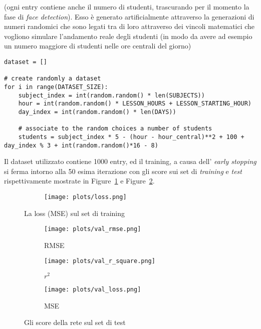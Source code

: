 \noindent
(ogni entry contiene anche il numero di studenti, trascurando per il momento la 
fase di \textit{face detection}). Esso è generato artificialmente attraverso la generazioni 
di numeri randomici che sono legati tra di loro attraverso dei vincoli matematici che vogliono 
simulare l'andamento reale degli studenti (in modo da avere ad esempio un numero maggiore di 
studenti nelle ore centrali del giorno)

\begin{verbatim}
dataset = []

# create randomly a dataset
for i in range(DATASET_SIZE):
    subject_index = int(random.random() * len(SUBJECTS))
    hour = int(random.random() * LESSON_HOURS + LESSON_STARTING_HOUR)
    day_index = int(random.random() * len(DAYS))

    # associate to the random choices a number of students
    students = subject_index * 5 - (hour - hour_central)**2 + 100 + day_index % 3 + int(random.random()*16 - 8)
\end{verbatim}

Il dataset utilizzato contiene 1000 entry, ed il training, a causa dell'
\textit{early stopping} si ferma intorno alla 50 esima iterazione con gli 
score sui set di \textit{training} e \textit{test} rispettivamente mostrate in 
Figure~\ref{fig:scores_training} e Figure~\ref{fig:scores_test}.

\smallskip

\begin{figure}[h]
    \centering
    \begin{subfigure}[b]{0.6\linewidth}
        \texttt{[image: plots/loss.png]}
    \end{subfigure}
    \caption{La loss (MSE) sul set di training}
    \label{fig:scores_training}
\end{figure}

\begin{figure}
    \centering
    
    \begin{subfigure}[b]{0.45\linewidth}
        \texttt{[image: plots/val\_rmse.png]}
        \caption{RMSE}
    \end{subfigure}
    \begin{subfigure}[b]{0.45\linewidth}
        \texttt{[image: plots/val\_r\_square.png]}
        \caption{$r^2$}
    \end{subfigure}
    \begin{subfigure}[b]{0.9\linewidth}
        \texttt{[image: plots/val\_loss.png]}
        \caption{MSE}
    \end{subfigure}
    \caption{Gli score della rete sul set di test}
    \label{fig:scores_test}
\end{figure}

